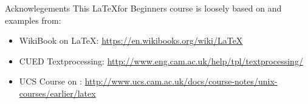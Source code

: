\documentclass[10pt,times]{beamer}
\begin{document}
\begin{frame}{Acknowlegements}
This \LaTeX for Beginners course is loosely based on and examples from:
\begin{itemize}
\item WikiBook on \LaTeX: \href{https://en.wikibooks.org/wiki/LaTeX}{https://en.wikibooks.org/wiki/LaTeX}
\item CUED Textprocessing: \href{http://www.eng.cam.ac.uk/help/tpl/textprocessing/}{http://www.eng.cam.ac.uk/help/tpl/textprocessing/}
\item UCS Course on \LaTeXe: \href{http://www.ucs.cam.ac.uk/docs/course-notes/unix-courses/earlier/latex}{http://www.ucs.cam.ac.uk/docs/course-notes/unix-courses/earlier/latex}
\end{itemize}
\end{frame}
\end{document}
